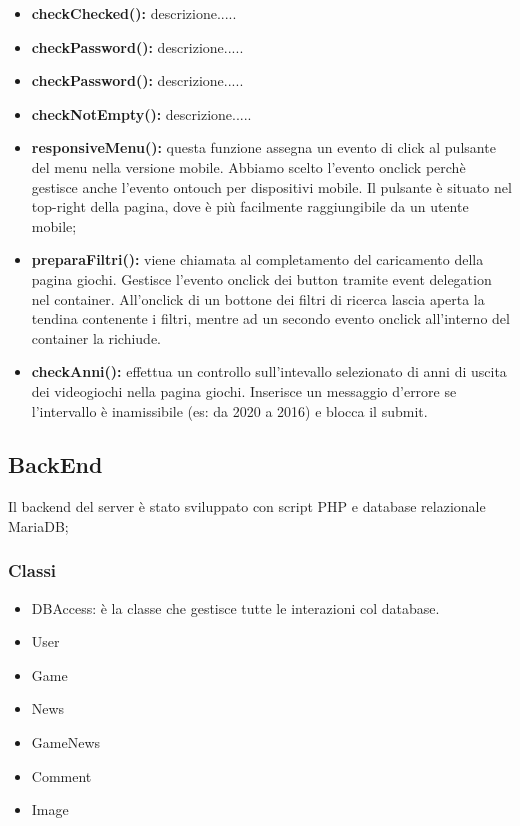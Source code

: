 \begin{itemize}
	\item \textbf{checkChecked(): } descrizione.....\\
	\item \textbf{checkPassword(): } descrizione.....\\
	\item \textbf{checkPassword(): } descrizione.....\\
	\item \textbf{checkNotEmpty(): } descrizione.....\\
	\item \textbf{responsiveMenu(): } questa funzione assegna un evento di click al pulsante del menu nella versione mobile.
	Abbiamo scelto l'evento onclick perchè gestisce anche l'evento ontouch per dispositivi mobile.
	Il pulsante è situato nel top-right della pagina, dove è più facilmente raggiungibile da un utente mobile;\\
	\item \textbf{preparaFiltri(): } viene chiamata al completamento del caricamento della pagina giochi. Gestisce l'evento onclick dei button tramite event delegation nel container. All'onclick di un bottone dei filtri di ricerca lascia aperta la tendina contenente i filtri, mentre ad un secondo evento onclick all'interno del container la richiude.\\
	\item \textbf{checkAnni(): } effettua un controllo sull'intevallo selezionato di anni di uscita dei videogiochi nella pagina giochi.
	Inserisce un messaggio d'errore se l'intervallo è inamissibile (es: da 2020 a 2016) e blocca il submit.\\
\end{itemize}

\subsection{BackEnd}
Il backend del server è stato sviluppato con script PHP e database relazionale MariaDB;


\subsubsection{Classi}
\begin{itemize}
	\item DBAccess: è la classe che gestisce tutte le interazioni col database.
	\item User
	\item Game
	\item News
	\item GameNews
	\item Comment
	\item Image
\end{itemize}

